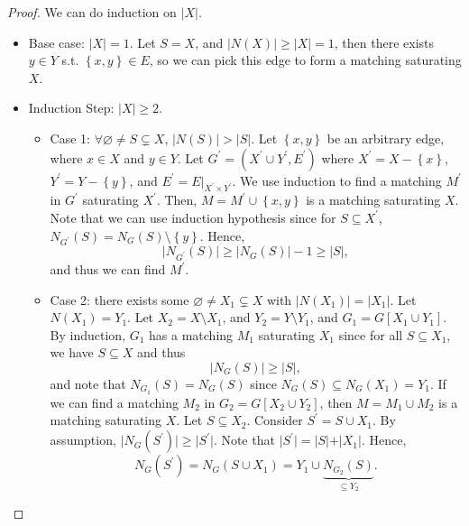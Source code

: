 \begin{proof}
    We can do induction on \(\vert X \vert \). 
    \begin{itemize}
        \item Base case: \(\vert X \vert = 1 \). Let \(S = X\), and \(\vert N(X) \vert \ge \vert X \vert = 1\), then there exists \(y \in Y\) s.t. \(\left\{ x, y \right\} \in E \), so we can pick this edge to form a matching saturating \(X\). 
        \item Induction Step: \(\vert X \vert \ge 2 \). 
        \begin{itemize}
            \item Case 1: \(\forall \varnothing \neq S \subsetneq X\), \(\vert N(S) \vert > \vert S \vert  \). Let \(\left\{ x, y \right\} \) be an arbitrary edge, where \(x \in X\) and \(y \in Y\). Let \(G^{\prime} = (X^{\prime} \cup Y^{\prime} , E^{\prime})\) where \(X^{\prime} = X - \left\{ x \right\} \), \(Y^{\prime} = Y - \left\{ y \right\} \), and \(E^{\prime} = E\vert_{X^{\prime}  \times Y^{\prime} }\). We use induction to find a matching \(M^{\prime} \) in \(G^{\prime} \) saturating \(X^{\prime} \). Then, \(M = M^{\prime} \cup \left\{ x, y \right\} \) is a matching saturating \(X\). Note that we can use induction hypothesis since for \(S \subseteq X^{\prime} \), \(N_{G^{\prime} }(S) = N_G(S) \setminus \left\{ y \right\} \). Hence, 
            \[
                \vert N_{G^{\prime} }(S) \vert \ge \vert N_G(S) \vert - 1 \ge \vert S \vert,   
            \]
            and thus we can find \(M^{\prime} \). 
            \item Case 2: there exists some \(\varnothing \neq X_1 \subsetneq X\) with \(\vert N(X_1) \vert = \vert X_1 \vert \). Let \(N(X_1) = Y_1\). Let \(X_2 = X \setminus X_1\), and \(Y_2 = Y \setminus Y_1\), and \(G_1 = G[X_1 \cup Y_1]\). By induction, \(G_1\) has a matching \(M_1\) saturating \(X_1\) since for all \(S \subseteq X_1\), we have \(S \subseteq X\) and thus 
            \[
                \vert N_G(S) \vert \ge \vert S \vert,  
            \]
            and note that \(N_{G_1}(S) = N_G(S) \) since \(N_G(S) \subseteq N_G(X_1) = Y_1\).     If we can find a matching \(M_2\) in \(G_2 = G[X_2 \cup Y_2]\), then \(M = M_1 \cup M_2\) is a matching saturating \(X\). Let \(S \subseteq X_2\). Consider \(S^{\prime} = S \cup X_1\). By assumption, \(\vert N_G(S^{\prime} ) \vert \ge \vert S^{\prime}  \vert  \). Note that \(\vert S^{\prime} \vert = \vert S \vert + \vert X_1 \vert   \). Hence, 
            \[
                N_G(S^{\prime} ) = N_G(S \cup X_1) = Y_1 \cup \underbrace{N_{G_2}(S)}_{\subseteq Y_2}.
\]
\end{itemize}
\end{itemize}
\end{proof}

